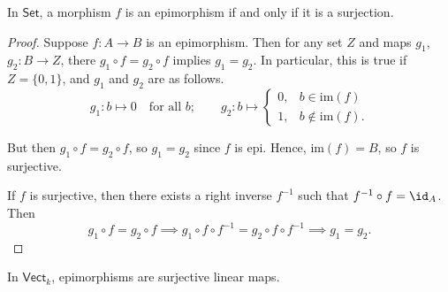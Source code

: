 \documentclass[main.tex]{subfiles}
\begin{document}
\begin{theorem}
  \label{thm:epimorphismsinset}
  In $\mathsf{Set}$, a morphism $f$ is an epimorphism if and only if it is a surjection.
\end{theorem}
\begin{proof}
  Suppose $f\colon A \to B$ is an epimorphism. Then for any set $Z$ and maps $g_{1}$, $g_{2}\colon B \to Z$, there $g_{1} \circ f = g_{2} \circ f$ implies $g_{1} = g_{2}$. In particular, this is true if $Z = \{ 0, 1 \}$, and $g_{1}$ and $g_{2}$ are as follows.
  \begin{equation*}
    g_{1}\colon b \mapsto 0 \quad \text{for all } b;\qquad g_{2}\colon b \mapsto
    \begin{cases}
      0, &b \in \mathrm{im}(f) \\
      1, &b \notin \mathrm{im}(f).
    \end{cases}
  \end{equation*}

  But then $g_{1} \circ f = g_{2} \circ f$, so $g_{1} = g_{2}$ since $f$ is epi. Hence, $\mathrm{im}(f) = B$, so $f$ is surjective.

  If $f$ is surjective, then there exists a right inverse $f^{-1}$ such that $f^{-1} \circ f = \id_{A}$. Then
  \begin{equation*}
    g_{1} \circ f = g_{2} \circ f \implies g_{1} \circ f \circ f^{-1} = g_{2} \circ f \circ f^{-1} \implies g_{1} = g_{2}.
  \end{equation*}
\end{proof}

\begin{example}
  In $\mathsf{Vect}_{k}$, epimorphisms are surjective linear maps.
\end{example}
\end{document}
